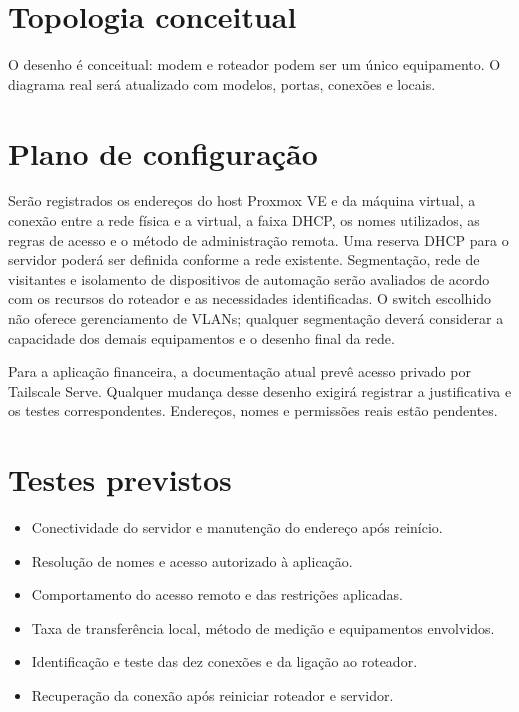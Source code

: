 \documentclass[11pt,a4paper,oneside]{report}
\begin{document}
\section{Topologia conceitual}
\begin{center}
\end{center}
O desenho é conceitual: modem e roteador podem ser um único equipamento.
O diagrama real será atualizado com modelos, portas, conexões e locais.

\section{Plano de configuração}
Serão registrados os endereços do host Proxmox VE e da máquina virtual,
a conexão entre a rede física e a virtual, a faixa DHCP, os nomes utilizados,
as regras de acesso e o método de administração remota. Uma reserva DHCP para
o servidor poderá ser definida conforme a rede existente. Segmentação, rede
de visitantes e isolamento de dispositivos de automação serão avaliados de
acordo com os recursos do roteador e as necessidades identificadas.
O switch escolhido não oferece gerenciamento de VLANs; qualquer segmentação
deverá considerar a capacidade dos demais equipamentos e o desenho final da rede.

Para a aplicação financeira, a documentação atual prevê acesso privado por
Tailscale Serve. Qualquer mudança desse desenho exigirá registrar a justificativa
e os testes correspondentes. Endereços, nomes e permissões reais estão pendentes.

\section{Testes previstos}
\begin{itemize}
\item Conectividade do servidor e manutenção do endereço após reinício.
\item Resolução de nomes e acesso autorizado à aplicação.
\item Comportamento do acesso remoto e das restrições aplicadas.
\item Taxa de transferência local, método de medição e equipamentos envolvidos.
\item Identificação e teste das dez conexões e da ligação ao roteador.
\item Recuperação da conexão após reiniciar roteador e servidor.
\end{itemize}
\end{document}
